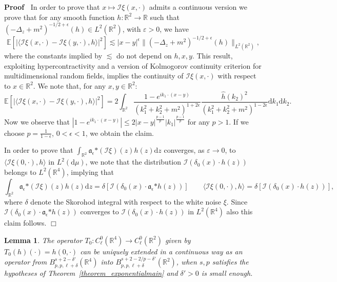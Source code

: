 \documentclass[a4paper,10pt]{article}
\newcommand{\asterisk}{\mathord{*}}
\newcommand{\mathd}{\mathrm{d}}
\newenvironment{proof}{\noindent\textbf{Proof\ }}{\hspace*{\fill}$\Box$\medskip}
\newtheorem{lemma}{Lemma}
\begin{document}
\begin{proof}
  In order to prove that $x \longmapsto \mathcal{I} \xi (x, \cdot)$ admits a
  continuous version we prove that for any smooth function $h : \mathbb{R}^2
  \rightarrow \mathbb{R}$ such that $(- \Delta_z + m^2)^{- 1 / 2 + \epsilon}
  (h) \in L^2 (\mathbb{R}^2)$, with $\varepsilon > 0$, we have
  \[ \mathbb{E} [| \langle \mathcal{I} \xi (x, \cdot) - \mathcal{I} \xi (y,
     \cdot), h \rangle |^2] \lesssim | x - y |^{\epsilon} \| (- \Delta_z +
     m^2)^{- 1 / 2 + \epsilon} (h) \|_{L^2 (\mathbb{R}^2)}, \]
  where the constants implied by $\lesssim$ do not depend on $h, x, y$. This
  result, exploiting hypercontractivity and a version of Kolmogorov continuity
  criterion for multidimensional random fields, implies the continuity of
  $\mathcal{I} \xi (x, \cdot)$ with respect to $x \in \mathbb{R}^2$. We note
  that, for any $x, y \in \mathbb{R}^2$:
  \[ \mathbb{E} [| \langle \mathcal{I} \xi (x, \cdot) - \mathcal{I} \xi (y,
     \cdot), h \rangle |^2] = 2 \int_{\mathbb{R}^2} \frac{1 - e^{i k_1 \cdot
     (x - y)}}{(k_1^2 + k_2^2 + m^2)^{1 + 2 \epsilon}} \frac{\hat{h}
     (k_2)^2}{(k_1^2 + k_2^2 + m^2)^{1 - 2 \epsilon}} \mathd k_1 \mathd k_2 .
  \]
  Now we observe that $| 1 - e^{i k_1 \cdot (x - y)} | \leqslant 2 | x - y
  |^{\frac{p - 1}{p}} | k_1 |^{\frac{p - 1}{p}}$ for any $p > 1$. If we choose
  $p = \frac{1}{1 - \epsilon}$, $0 < \epsilon < 1$, we obtain the claim.
  
  In order to prove that $\int_{\mathbb{R}^2} \mathfrak{a}_{\epsilon}
  \asterisk (\mathcal{I} \xi) (z) h (z) \mathd z$ converges, as $\varepsilon
  \rightarrow 0$, to $\langle \mathcal{I} \xi (0, \cdot), h \rangle$ in $L^2
  (\mathd \mu)$, we note that the distribution $\mathcal{I} (\delta_0 (x)
  \cdot h (z))$ belongs to $L^2 (\mathbb{R}^4)$, implying that
  \[ \int_{\mathbb{R}^2} \mathfrak{a}_{\epsilon} \asterisk (\mathcal{I} \xi)
     (z) h (z) \mathd z = \delta [\mathcal{I} (\delta_0 (x) \cdot
     \mathfrak{a}_{\epsilon} \asterisk h (z))] \qquad \langle \mathcal{I} \xi
     (0, \cdot), h \rangle = \delta [\mathcal{I} (\delta_0 (x) \cdot h (z))],
  \]
  where $\delta$ denote the Skorohod integral with respect to the white noise
  $\xi$. Since $\mathcal{I} (\delta_0 (x) \cdot \mathfrak{a}_{\epsilon}
  \asterisk h (z))$ converges to $\mathcal{I} (\delta_0 (x) \cdot h (z))$ in
  $L^2 (\mathbb{R}^4)$ also this claim follows. 
\end{proof}

\begin{lemma}
  \label{lemma_trace}The operator $T_0 : C^0_{\ell} (\mathbb{R}^4) \rightarrow
  C^0_{\ell} (\mathbb{R}^2)$ given by $T_0 (h) (\cdot) = h (0, \cdot)$ can be
  uniquely extended in a continuous way as an operator from $B^{s + 2 -
  \delta'}_{p, p, \ell + \delta} (\mathbb{R}^4)$ into $B^{s + 2 - 2 / p -
  \delta'}_{p, p, \ell + \delta} (\mathbb{R}^2)$, when $s, p$ satisfies the
  hypotheses of Theorem~\ref{theorem_exponentialmain} and $\delta' > 0$ is
  small enough.
\end{lemma}
\end{document}
